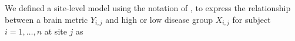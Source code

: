 We defined a site-level model using the notation of \cite{Raudenbush2000}, to express the relationship between a brain metric $Y_{i,j}$ and high or low disease group $X_{i,j}$ for subject $i=1,\ldots,n$ at site $j$  as %